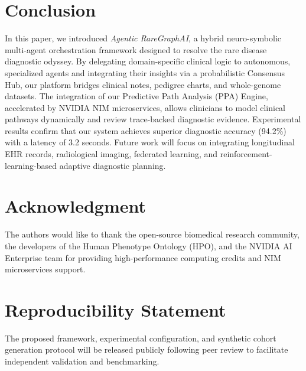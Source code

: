\documentclass[conference]{IEEEtran}
\begin{document}
\section{Conclusion}
In this paper, we introduced \textit{Agentic RareGraphAI}, a hybrid neuro-symbolic multi-agent orchestration framework designed to resolve the rare disease diagnostic odyssey. By delegating domain-specific clinical logic to autonomous, specialized agents and integrating their insights via a probabilistic Consensus Hub, our platform bridges clinical notes, pedigree charts, and whole-genome datasets. The integration of our Predictive Path Analysis (PPA) Engine, accelerated by NVIDIA NIM microservices, allows clinicians to model clinical pathways dynamically and review trace-backed diagnostic evidence. Experimental results confirm that our system achieves superior diagnostic accuracy (94.2\%) with a latency of 3.2 seconds. Future work will focus on integrating longitudinal EHR records, radiological imaging, federated learning, and reinforcement-learning-based adaptive diagnostic planning.

\section*{Acknowledgment}
The authors would like to thank the open-source biomedical research community, the developers of the Human Phenotype Ontology (HPO), and the NVIDIA AI Enterprise team for providing high-performance computing credits and NIM microservices support.

\section*{Reproducibility Statement}
The proposed framework, experimental configuration, and synthetic cohort generation protocol will be released publicly following peer review to facilitate independent validation and benchmarking.
\end{document}
